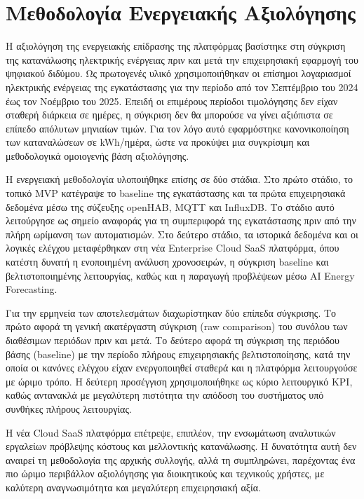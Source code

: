 \section{Μεθοδολογία Ενεργειακής Αξιολόγησης}
Η αξιολόγηση της ενεργειακής επίδρασης της πλατφόρμας βασίστηκε στη σύγκριση της κατανάλωσης ηλεκτρικής ενέργειας πριν και μετά την επιχειρησιακή εφαρμογή του ψηφιακού διδύμου. Ως πρωτογενές υλικό χρησιμοποιήθηκαν οι επίσημοι λογαριασμοί ηλεκτρικής ενέργειας της εγκατάστασης για την περίοδο από τον Σεπτέμβριο του 2024 έως τον Νοέμβριο του 2025. Επειδή οι επιμέρους περίοδοι τιμολόγησης δεν είχαν σταθερή διάρκεια σε ημέρες, η σύγκριση δεν θα μπορούσε να γίνει αξιόπιστα σε επίπεδο απόλυτων μηνιαίων τιμών. Για τον λόγο αυτό εφαρμόστηκε κανονικοποίηση των καταναλώσεων σε \textlatin{kWh}/ημέρα, ώστε να προκύψει μια συγκρίσιμη και μεθοδολογικά ομοιογενής βάση αξιολόγησης.

Η ενεργειακή μεθοδολογία υλοποιήθηκε επίσης σε δύο στάδια. Στο πρώτο στάδιο, το τοπικό \textlatin{MVP} κατέγραψε το \textlatin{baseline} της εγκατάστασης και τα πρώτα επιχειρησιακά δεδομένα μέσω της σύζευξης \textlatin{openHAB}, \textlatin{MQTT} και \textlatin{InfluxDB}. Το στάδιο αυτό λειτούργησε ως σημείο αναφοράς για τη συμπεριφορά της εγκατάστασης πριν από την πλήρη ωρίμανση των αυτοματισμών. Στο δεύτερο στάδιο, τα ιστορικά δεδομένα και οι λογικές ελέγχου μεταφέρθηκαν στη νέα \textlatin{Enterprise Cloud SaaS} πλατφόρμα, όπου κατέστη δυνατή η ενοποιημένη ανάλυση χρονοσειρών, η σύγκριση \textlatin{baseline} και βελτιστοποιημένης λειτουργίας, καθώς και η παραγωγή προβλέψεων μέσω \textlatin{AI Energy Forecasting}.

Για την ερμηνεία των αποτελεσμάτων διαχωρίστηκαν δύο επίπεδα σύγκρισης. Το πρώτο αφορά τη γενική ακατέργαστη σύγκριση (\textlatin{raw comparison}) του συνόλου των διαθέσιμων περιόδων πριν και μετά. Το δεύτερο αφορά τη σύγκριση της περιόδου βάσης (\textlatin{baseline}) με την περίοδο πλήρους επιχειρησιακής βελτιστοποίησης, κατά την οποία οι κανόνες ελέγχου είχαν ενεργοποιηθεί σταθερά και η πλατφόρμα λειτουργούσε με ώριμο τρόπο. Η δεύτερη προσέγγιση χρησιμοποιήθηκε ως κύριο λειτουργικό \textlatin{KPI}, καθώς αντανακλά με μεγαλύτερη πιστότητα την απόδοση του συστήματος υπό συνθήκες πλήρους λειτουργίας.

Η νέα \textlatin{Cloud SaaS} πλατφόρμα επέτρεψε, επιπλέον, την ενσωμάτωση αναλυτικών εργαλείων πρόβλεψης κόστους και μελλοντικής κατανάλωσης. Η δυνατότητα αυτή δεν αναιρεί τη μεθοδολογία της αρχικής συλλογής, αλλά τη συμπληρώνει, παρέχοντας ένα πιο ώριμο περιβάλλον αξιολόγησης για διοικητικούς και τεχνικούς χρήστες, με καλύτερη αναγνωσιμότητα και μεγαλύτερη επιχειρησιακή αξία.

